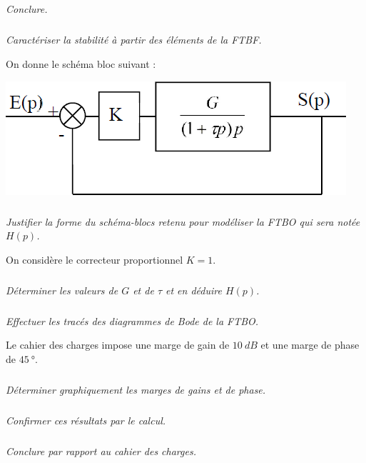 \documentclass[10pt,fleqn]{article} %
\begin{document}
\begin{multicols}{2}
\subparagraph{}\textit{Conclure.}
\ifprof
\begin{corrige}
\end{corrige}
\else
\fi

\subparagraph{}\textit{Caractériser la stabilité à partir des éléments de la FTBF.}
\ifprof
\begin{corrige}
\end{corrige}
\else
\fi
On donne le schéma bloc suivant :

\begin{center}
\includegraphics[width=\linewidth]{images/fig_02}
\end{center}

\subparagraph{}\textit{Justifier la forme du schéma-blocs retenu pour modéliser la FTBO qui sera notée $H(p)$.}
\ifprof
\begin{corrige}
\end{corrige}
\else
\fi

On considère le correcteur proportionnel $K=1$. 
\subparagraph{}\textit{Déterminer les valeurs de $G$ et de $\tau$ et en déduire $H(p)$.}
\ifprof
\begin{corrige}
\end{corrige}
\else
\fi

\subparagraph{}\textit{Effectuer les tracés des diagrammes de Bode de la FTBO.}
\ifprof
\begin{corrige}
\end{corrige}
\else
\fi
Le cahier des charges impose une marge de gain de $\SI{10}{dB}$ et une marge de phase de $
\SI{45}{\degree}$.

\subparagraph{}\textit{Déterminer graphiquement les marges de gains et de phase.}
\ifprof
\begin{corrige}
\end{corrige}
\else
\fi

\subparagraph{}\textit{Confirmer ces résultats par le calcul.}
\ifprof
\begin{corrige}
\end{corrige}
\else
\fi

\subparagraph{}\textit{Conclure par rapport au cahier des charges.}
\ifprof
\begin{corrige}
\end{corrige}
\else
\fi


\end{multicols}
\end{document}
